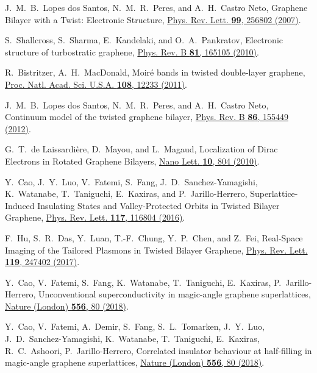 \documentclass[twocolumn,english,prl,floatfix,citeautoscript,nofootinbib]{revtex4}
\begin{document}
\begin{thebibliography}{999}
 J.~M.~B.~Lopes dos Santos, N.~M.~R.~Peres,
and A.~H.~Castro Neto, Graphene Bilayer with a Twist: Electronic Structure,
\href{https://doi.org/10.1103/PhysRevLett.99.256802}{Phys. Rev. Lett.
\textbf{99}, 256802 (2007)}.

 S.~Shallcross, S.~Sharma, E.~Kandelaki, and
O.~A.~Pankratov, Electronic structure of turbostratic graphene, \href{https://doi.org/10.1103/PhysRevB.81.165105}%
{Phys. Rev. B \textbf{81}, 165105 (2010)}.

 R.~Bistritzer, A.~H.~MacDonald, Moir\'e bands in
twisted double-layer graphene, \href{https://doi.org/10.1073/pnas.1108174108}%
{Proc. Natl. Acad. Sci. U.S.A. \textbf{108}, 12233 (2011)}.

 J.~M.~B.~Lopes dos Santos, N.~M.~R.~Peres, and
A.~H.~Castro Neto, Continuum model of the twisted graphene bilayer, \href{https://doi.org/10.1103/PhysRevB.86.155449}%
{Phys. Rev. B \textbf{86}, 155449 (2012)}.

 G.~T.~de Laissardi\`ere, D.~Mayou, and L.~Magaud,
Localization of Dirac Electrons in Rotated Graphene Bilayers, \href{https://doi.org/10.1021/nl902948m}%
{Nano Lett. \textbf{10}, 804 (2010)}.

 Y.~Cao, J.~Y.~Luo, V.~Fatemi, S.~Fang,
J.~D.~Sanchez-Yamagishi, K.~Watanabe, T.~Taniguchi, E.~Kaxiras, and
P.~Jarillo-Herrero, Superlattice-Induced Insulating States and
Valley-Protected Orbits in Twisted Bilayer Graphene, \href{https://doi.org/10.1103/PhysRevLett.117.116804}%
{Phys. Rev. Lett. \textbf{117}, 116804 (2016)}.

 F.~Hu, S.~R.~Das, Y.~Luan, T.-F.~Chung,
Y.~P.~Chen, and Z.~Fei, Real-Space Imaging of the Tailored Plasmons in
Twisted Bilayer Graphene, \href{https://doi.org/10.1103/PhysRevLett.119.247402}%
{Phys. Rev. Lett. \textbf{119}, 247402 (2017)}.


 Y.~Cao, V.~Fatemi, S.~Fang, K.~Watanabe,
T.~Taniguchi, E.~Kaxiras, P.~Jarillo-Herrero, Unconventional
superconductivity in magic-angle graphene superlattices, \href{https://doi.org/10.1038/nature26160}%
{Nature (London) \textbf{556}, 80 (2018)}.

 Y.~Cao, V.~Fatemi, A.~Demir, S.~Fang, S.~L.~Tomarken,
J.~Y.~Luo, J.~D.~Sanchez-Yamagishi, K.~Watanabe, T.~Taniguchi, E.~Kaxiras,
R.~C.~Ashoori, P.~Jarillo-Herrero, Correlated insulator behaviour at
half-filling in magic-angle graphene superlattices, \href{https://doi.org/10.1038/nature26154}%
{Nature (London) \textbf{556}, 80 (2018)}.


\end{thebibliography}
\end{document}

